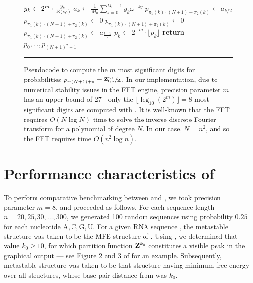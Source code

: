 \begin{figure}[!ht]
\begin{algorithmic}[1]
\State $y_k \gets 2^m \cdot \frac{y_k}{{\mathcal Z}_{}(\nu_0)}$
\EndFor
{}
\State $a_k \gets \frac{1}{M_0} \sum_{k=0}^{M_0-1} y_k \omega^{-kj}$
\EndFor
{}
\State $p_{\pi_1(k) \cdot (N+1) + \pi_2(k)} \gets a_{k/2}$
\Else
\State $p_{\pi_1(k) \cdot (N+1) + \pi_2(k)} \gets 0$
\EndIf
\Else
{}
\State $p_{\pi_1(k) \cdot (N+1) + \pi_2(k)} \gets 0$
\Else
\State $p_{\pi_1(k) \cdot (N+1) + \pi_2(k)} \gets a_{\frac{k-1}{2}}$
\EndIf
\EndIf
\EndFor
{}
\State $p_k \gets 2^{-m} \cdot \lfloor p_k \rfloor$
\EndFor
\State \textbf{return} $p_0,\dots,p_{(N + 1)^2 - 1}$
\EndFunction
\rule[-0.35ex]{0pt}{0pt}
\end{algorithmic}
\caption{
Pseudocode to compute the $m$ most significant digits
for probabilities
$p_{r\cdot(N + 1)+s} = \sfrac{{\bf Z}^{r,s}_{1,n}}{{\bf Z}^{}_{}}$. In our implementation,
due to numerical stability issues in the FFT engine, precision parameter
$m$ has an upper bound of 27---only the $\lfloor \log_{10}(2^m) \rfloor =8$ most significant digits
are computed with \ffttwo. It is well-known that
the FFT requires $O(N \log N)$ time to solve the inverse discrete
Fourier transform for a polynomial of degree $N$. In our case,
$N=n^2$, and so the FFT requires time $O(n^2 \log n)$.
}
\label{fig:ffttwo:algoImproved}
\rule[0ex]{0pt}{1.5em} \hrule
\end{figure}

\section{Performance characteristics of \ffttwo}
\label{sec:ffttwo:speed}

To perform comparative benchmarking between \rnatwofold and \ffttwo,
we took precision parameter $m=8$, and proceeded as follows.
For each sequence length $n = 20,25,30,\ldots,300$, we generated
100 random sequences using probability $0.25$ for each nucleotide
A,\,C,\,G,\,U.
For a given RNA sequence \seq, the metastable structure \strA was
taken to be the MFE structure of \seq.
Using \rnabor, we determined that value $k_0 \geq 10$, for which
partition function ${\bf Z}^{k_0}_{}$ constitutes a visible peak in the graphical
output --- see Figure 2 and 3 of \cite{Freyhult.b07} for an example.
Subsequently, metastable structure \strB was taken to be that structure
having minimum free energy over all structures, whose base pair distance from
\strA was $k_0$.

